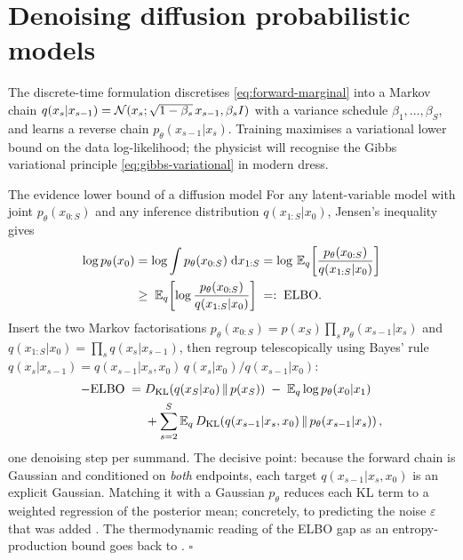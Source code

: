 \section{Denoising diffusion probabilistic models}\label{sec:ddpm}

The discrete-time formulation \citep{sohl2015deep, ho2020denoising}
discretises \eqref{eq:forward-marginal} into a Markov chain
$q(x_s | x_{s-1}) = \mathcal{N}(x_s; \sqrt{1 - \beta_s}\, x_{s-1}, \beta_s I)$
with a variance schedule $\beta_1, \dots, \beta_S$, and learns a reverse
chain $p_\theta(x_{s-1} | x_s)$. Training maximises a variational lower
bound on the data log-likelihood; the physicist will recognise the Gibbs
variational principle \eqref{eq:gibbs-variational} in modern dress.

\begin{toolbox}{The evidence lower bound of a diffusion model}
For any latent-variable model with joint $p_\theta(x_{0:S})$ and any
inference distribution $q(x_{1:S} | x_0)$, Jensen's inequality gives
\begin{align*}
  \log p_\theta(x_0)
  &= \log \int p_\theta(x_{0:S})\;\mathrm{d} x_{1:S}
   = \log\, \mathbb{E}_{q}\!\left[
      \frac{p_\theta(x_{0:S})}{q(x_{1:S}|x_0)} \right] \\
  &\geq\; \mathbb{E}_{q}\!\left[
      \log \frac{p_\theta(x_{0:S})}{q(x_{1:S}|x_0)} \right]
  \;=:\; \mathrm{ELBO}.
\end{align*}
Insert the two Markov factorisations
$p_\theta(x_{0:S}) = p(x_S) \prod_s p_\theta(x_{s-1}|x_s)$ and
$q(x_{1:S}|x_0) = \prod_s q(x_s|x_{s-1})$, then regroup telescopically
using Bayes' rule
$q(x_s|x_{s-1}) = q(x_{s-1}|x_s, x_0)\, q(x_s|x_0) / q(x_{s-1}|x_0)$:
\begin{align*}
  -\mathrm{ELBO}
  \;=\;& D_{\mathrm{KL}}\!\left(q(x_S|x_0) \,\|\, p(x_S)\right)
  \;-\; \mathbb{E}_q \log p_\theta(x_0 | x_1) \\
  &+ \sum_{s=2}^{S}
    \mathbb{E}_q\, D_{\mathrm{KL}}\!\left(q(x_{s-1}|x_s, x_0) \,\|\, p_\theta(x_{s-1}|x_s)\right) ,
\end{align*}
one denoising step per summand. The decisive point: because the forward
chain is Gaussian and conditioned on \emph{both} endpoints, each target
$q(x_{s-1} | x_s, x_0)$ is an explicit Gaussian. Matching it with a
Gaussian $p_\theta$ reduces each KL term to a weighted regression of the
posterior mean; concretely, to predicting the noise $\varepsilon$ that
was added \citep{ho2020denoising}. The thermodynamic reading of the ELBO
gap as an entropy-production bound goes back to \citet{sohl2015deep}.
\hfill$\square$
\end{toolbox}

